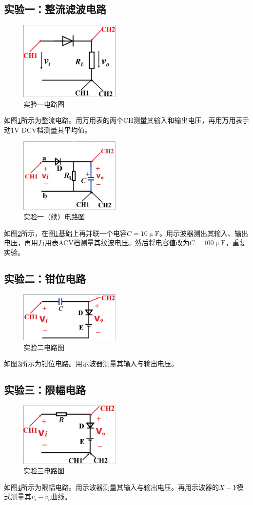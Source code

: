 \documentclass[a4paper,11pt,UTF8]{ctexart}
\begin{document}
\subsection{实验一：整流滤波电路}
\begin{figure}[H]
 \centering
 \includegraphics[width=5cm]{Exp1}
 \caption{实验一电路图}
 \label{fig:Exp1}
\end{figure}
如图\ref{fig:Exp1}所示为整流电路。用万用表的两个CH测量其输入和输出电压，再用万用表手动1V DCV档测量其平均值。
\begin{figure}[H]
 \centering
 \includegraphics[width=5cm]{Exp1Con}
 \caption{实验一（续）电路图}
 \label{fig:Exp1Con}
\end{figure}
如图\ref{fig:Exp1Con}所示，在图\ref{fig:Exp1}基础上再并联一个电容$C=10\mathrm{\upmu F}$。用示波器测出其输入、输出电压，再用万用表ACV档测量其纹波电压。然后将电容值改为$C=100\mathrm{\upmu F}$，重复实验。
\subsection{实验二：钳位电路}
\begin{figure}[H]
 \centering
 \includegraphics[width=5cm]{Exp2}
 \caption{实验二电路图}
 \label{fig:Exp2}
\end{figure}
如图\ref{fig:Exp2}所示为钳位电路。用示波器测量其输入与输出电压。
\subsection{实验三：限幅电路}
\begin{figure}[H]
 \centering
 \includegraphics[width=5cm]{Exp3}
 \caption{实验三电路图}
 \label{fig:Exp3}
\end{figure}
如图\ref{fig:Exp3}所示为限幅电路。用示波器测量其输入与输出电压。再用示波器的$X - Y$模式测量其$v_i - v_o$曲线。
\end{document}
